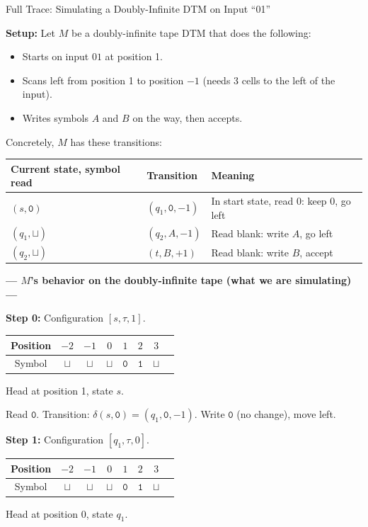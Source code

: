 \begin{examplebox}{{Full Trace: Simulating a Doubly-Infinite DTM on Input ``01''}}

\textbf{Setup:} Let $M$ be a doubly-infinite tape DTM that does the following:
\begin{itemize}[nosep]
\item Starts on input $01$ at position 1.
\item Scans left from position 1 to position $-1$ (needs 3 cells to the left
  of the input).
\item Writes symbols $A$ and $B$ on the way, then accepts.
\end{itemize}

Concretely, $M$ has these transitions:
\begin{center}
\begin{tabular}{lll}
\toprule
\textbf{Current state, symbol read} & \textbf{Transition} & \textbf{Meaning} \\
\midrule
$(s, \mathtt{0})$ & $(q_1, \mathtt{0}, -1)$ & In start state, read 0: keep 0, go left \\
$(q_1, \sqcup)$ & $(q_2, A, -1)$ & Read blank: write $A$, go left \\
$(q_2, \sqcup)$ & $(t, B, +1)$ & Read blank: write $B$, accept \\
\bottomrule
\end{tabular}
\end{center}

\bigskip
\textbf{--- $M$'s behavior on the doubly-infinite tape (what we are simulating) ---}

\textbf{Step 0:} Configuration $[s, \tau, 1]$.

\begin{center}
\begin{tabular}{c|ccccccc}
Position & $-2$ & $-1$ & $0$ & $1$ & $2$ & $3$ \\
\hline
Symbol & $\sqcup$ & $\sqcup$ & $\sqcup$ & $\mathtt{0}$ & $\mathtt{1}$ & $\sqcup$ \\
\end{tabular}
\quad Head at position 1, state $s$.
\end{center}

Read $\mathtt{0}$. Transition: $\delta(s, \mathtt{0}) = (q_1, \mathtt{0}, -1)$.
Write $\mathtt{0}$ (no change), move left.

\textbf{Step 1:} Configuration $[q_1, \tau, 0]$.

\begin{center}
\begin{tabular}{c|ccccccc}
Position & $-2$ & $-1$ & $0$ & $1$ & $2$ & $3$ \\
\hline
Symbol & $\sqcup$ & $\sqcup$ & $\sqcup$ & $\mathtt{0}$ & $\mathtt{1}$ & $\sqcup$ \\
\end{tabular}
\quad Head at position 0, state $q_1$.
\end{center}


\end{examplebox}

